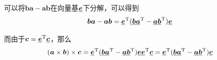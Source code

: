 可以将$\bm{b}\bm{a} - \bm{a}\bm{b}$在向量基$\ubm{e}$下分解，可以得到
\begin{equation*}
    \bm{b}\bm{a} - \bm{a}\bm{b} = \ubm{e}^\T (\ubm{b}\ubm{a}^\T - \ubm{a}\ubm{b}^\T)\ubm{e}
\end{equation*}

而由于$\bm{c} = \ubm{e}^\T\ubm{c}$，那么
\begin{equation}
    (\bm{a} \times \bm{b}) \times \bm{c} = \ubm{e}^\T (\ubm{b}\ubm{a}^\T - \ubm{a}\ubm{b}^\T)\ubm{e} \ubm{e}^\T \ubm{c} = \ubm{e}^\T (\ubm{b}\ubm{a}^\T - \ubm{a}\ubm{b}^\T) \ubm{c}
\end{equation}




















